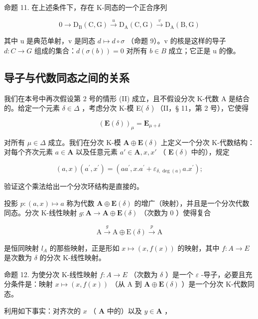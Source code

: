 命题 11. 在上述条件下，存在 K-同态的一个正合序列

\[
0 \rightarrow \mathrm{D} _ {\mathrm{B}} (\mathrm{C}, \mathrm{G}) \xrightarrow {u} \mathrm{D} _ {\mathrm{A}} (\mathrm{C}, \mathrm{G}) \xrightarrow {v} \mathrm{D} _ {\mathrm{A}} (\mathrm{B}, \mathrm{G})\tag{27}
\]

其中 u 是典范单射，v 是同态 \(d \mapsto d \circ \sigma\) （命题 9）。v 的核是这样的导子 \(d: C \to G\) 组成的集合：\(d(\sigma(b)) = 0\) 对所有 \(b \in B\) 成立；它正是 u 的像。

\subsection{导子与代数同态之间的关系}

我们在本号中再次假设第 2 号的情形 (II) 成立，且不假设分次 K-代数 A 是结合的。给定一个元素 \(\delta \in \Delta\) ，考虑分次 K-模 E( \(\delta\) ) （II，§ 11，第 2 号），它使得

\[
(\mathbf {E} (\delta)) _ {\mu} = \mathbf {E} _ {\mu + \delta}
\]

对所有 \(\mu \in \Delta\) 成立。我们在分次 K-模 \(\mathbf{A} \oplus \mathbf{E}(\delta)\) 上定义一个分次 K-代数结构：对每个齐次元素 \(a \in \mathbf{A}\) 以及任意元素 \(a' \in \mathbf{A}, x, x'\) （ \(\mathbf{E}(\delta)\) 中的），规定

\[
(a, x) \left(a ^ {\prime}, x ^ {\prime}\right) = \left(a a ^ {\prime}, x. a ^ {\prime} + \varepsilon_ {\delta, \deg (a)} a. x ^ {\prime}\right);\tag{28}
\]

验证这个乘法给出一个分次环结构是直接的。

投影 \(p:(a,x)\mapsto a\) 称为代数 \(\mathbf{A}\oplus\mathbf{E}(\delta)\) 的增广（映射），并且是一个分次代数同态。分次 K-线性映射 \(g:\mathbf{A}\to\mathbf{A}\oplus\mathbf{E}(\delta)\) （次数为 0 ）使得复合

\[
\mathrm{A} \xrightarrow {g} \mathrm{A} \oplus \mathrm{E} (\delta) \xrightarrow {p} \mathrm{A}
\]

是恒同映射 \(l_{A}\) 的那些映射，正是形如 \(x \mapsto (x, f(x))\) 的映射，其中 \(f: A \to E\) 是次数为 \(\delta\) 的分次 K-线性映射。

命题 12. 为使分次 K-线性映射 \(f:A\to E\) （次数为 \(\delta\) ）是一个 \(\varepsilon\) -导子，必要且充分条件是：映射 \(x\mapsto(x,f(x))\) （从 A 到 \(\mathbf{A}\oplus\mathbf{E}(\delta)\) ）是一个分次 K-代数同态。

利用如下事实：对齐次的 \(x\) （ \(\mathbf{A}\) 中的）以及 \(y \in \mathbf{A}\) ，

